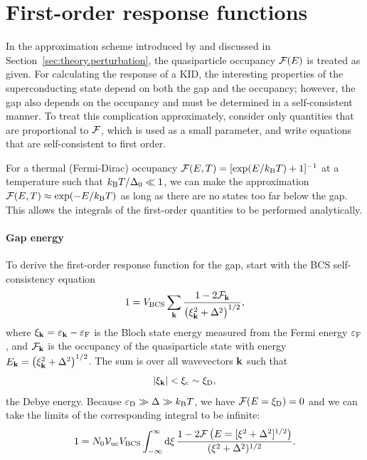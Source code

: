 \chapter{First-order response functions}
\label{chp:first-order_response}

In the approximation scheme introduced by \textcite{Zmuidzinas2012ARCMP} and discussed in Section~\ref{sec:theory.perturbation}, the quasiparticle occupancy $\mathcal{F}(E)$ is treated as given.
For calculating the response of a KID, the interesting properties of the superconducting state depend on both the gap and the occupancy; however, the gap also depends on the occupancy and must be determined in a self-consistent manner.
To treat this complication approximately, consider only quantities that are proportional to $\mathcal{F}$, which is used as a small parameter, and write equations that are self-consistent to first order.

For a thermal (Fermi-Dirac) occupancy
$\mathcal{F}(E, T) = [\exp(E / k_\mathrm{B} T) + 1]^{-1}$
at a temperature such that
$k_\mathrm{B} T / \Delta_0 \ll 1$,
we can make the approximation
$\mathcal{F}(E, T) \approx \exp(-E / k_\mathrm{B} T)$ as long as there are no states too far below the gap.
This allows the integrals of the first-order quantities to be performed analytically.

\subsubsection{Gap energy}

To derive the first-order response function for the gap, start with the BCS self-consistency equation~\autocite{Tinkham2004}
\begin{equation}
1 
  =
  V_\mathrm{BCS} \sum_{\vb{k}} \frac{1 - 2 \mathcal{F}_{\vb{k}}}{\left( \xi_{\vb{k}}^2 + \Delta^2 \right)^{1/2}},
\end{equation}
where
$\xi_{\vb{k}} = \varepsilon_{\vb{k}} - \varepsilon_{\mathrm{F}}$
is the Bloch state energy measured from the Fermi energy $\varepsilon_{\mathrm{F}}$,
and $\mathcal{F}_{\vb{k}}$ is the occupancy of the quasiparticle state with energy
$E_{\vb{k}} = \left( \xi_{\vb{k}}^2 + \Delta^2 \right)^{1/2}$.
The sum is over all wavevectors $\vb{k}$ such that
\begin{equation}
\left| \xi_{\vb{k}} \right|
  <
  \xi_{\mathrm{c}}
  \sim
  \xi_{\mathrm{D}},
\end{equation}
the Debye energy.
Because $\varepsilon_{\mathrm{D}} \gg \Delta \gg k_\mathrm{B} T$, we have
$\mathcal{F}(E = \xi_{\mathrm{D}}) = 0$
and we can take the limits of the corresponding integral to be infinite:
\begin{equation}
1
  =
  N_0 \mathcal{V}_\mathrm{uc} V_\mathrm{BCS}
  \int_{-\infty}^\infty \dd{\xi}
  \frac{1 - 2 \mathcal{F} \left(E = [\xi^2 + \Delta^2]^{1/2} \right)}{(\xi^2 + \Delta^2)^{1/2}}.
\end{equation}

